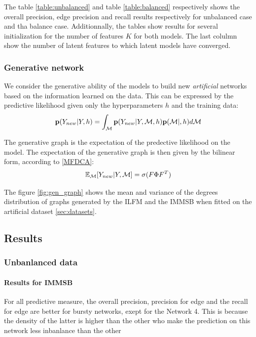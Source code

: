 The table \ref{table:unbalanced} and table \ref{table:balanced} respectively shows the overall precision, edge precision and recall results respectively for unbalanced case and tha balance case. Additionnally, the tables show results for several initialization for the number of features $K$ for both models. The last colulmn show the number of latent features to which latent models have converged.

\subsubsection{Generative network}
We consider the generative ability of the models to build new \emph{artificial} networks based on the information learned on the data. This can be expressed by the predictive likelihood given only the hyperparameters $h$ and the training data:
\begin{equation}
    \mathbf{p}(Y_{new} |Y, h) = \int_{\mathcal{M}} \mathbf{p}(Y_{new} |Y,\mathcal{M}, h)\mathbf{p}(\mathcal{M} |, h)d\mathcal{M}
\end{equation}

The generative graph is the expectation of the predective likelihood on the model. The expectation of the generative graph is then given by the bilinear form, according to \ref{MFDCA}:
\begin{equation}
    \mathbb{E}_{\mathcal{M}}[Y_{new} | Y, \mathcal{M}] = \sigma(F \Phi F^T)
\end{equation}


The figure \ref{fig:gen_graph} shows the mean and variance of the degrees distribution of graphs generated by the ILFM and the IMMSB when fitted on the artificial dataset \ref{sec:datasets}.


\subsection{Results}

\subsubsection{Unbanlanced data}

\paragraph{Results for IMMSB}

For all predictive measure, the overall precision, precision for edge and the recall for edge are better for bursty networks, exept for the Network 4. This is because the density of the latter is higher than the other who make the prediction on this network less inbanlance than the other

